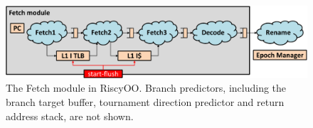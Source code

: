 \documentclass[conference]{IEEEtran}
\begin{document}
\begin{figure}[!htb]
    \centering
    \includegraphics[width=\columnwidth]{figs/fetch_cropped.pdf}
    \caption{The Fetch module in RiscyOO. Branch predictors, including the branch target buffer, tournament direction predictor and return address stack, are not shown.}\label{fig:fetch}
\end{figure}

\end{document}
